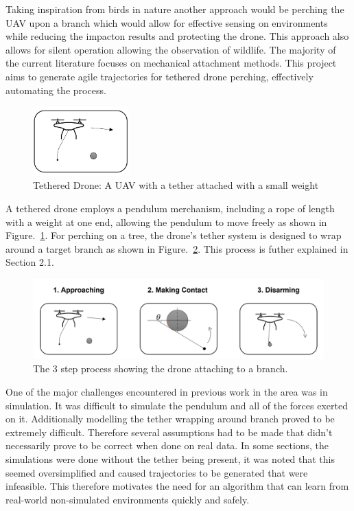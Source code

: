 Taking inspiration from birds in nature another approach would be perching the UAV upon a branch which would allow for effective sensing on environments while reducing the impacton results and protecting the drone.
This approach also allows for silent operation allowing the observation of wildlife.
The majority of the current literature focuses on mechanical attachment methods.
This project aims to generate agile trajectories for tethered drone perching, effectively automating the process.


\begin{figure}[htbp]
  \centering
  \includegraphics[width=0.33\textwidth]{introduction/tetheredDroneImage.png}
  \caption{Tethered Drone: A UAV with a tether attached with a small weight}
\label{fig:intro-tethered-drone}
\end{figure}

A tethered drone employs a pendulum merchanism, including a rope of length with a weight at one end, allowing the pendulum to move freely as shown in Figure.~\ref*{fig:intro-tethered-drone}.
For perching on a tree, the drone's tether system is designed to wrap around a target branch as shown in Figure.~\ref{fig:intro-wrapping}.
This process is futher explained in Section 2.1.

\begin{figure}[htbp]
  \centering
  \includegraphics[width=\textwidth]{introduction/dronePerching.png}
  \caption{The 3 step process showing the drone attaching to a branch.}
\label{fig:intro-wrapping}
\end{figure}

One of the major challenges encountered in previous work in the area was in simulation.
It was difficult to simulate the pendulum and all of the forces exerted on it.
Additionally modelling the tether wrapping around branch proved to be extremely difficult.
Therefore several assumptions had to be made that didn't necessarily prove to be correct when done on real data.
In some sections, the simulations were done without the tether being present, it was noted that this seemed oversimplified and caused trajectories to be generated that were infeasible.
This therefore motivates the need for an algorithm that can learn from real-world non-simulated environments quickly and safely.

